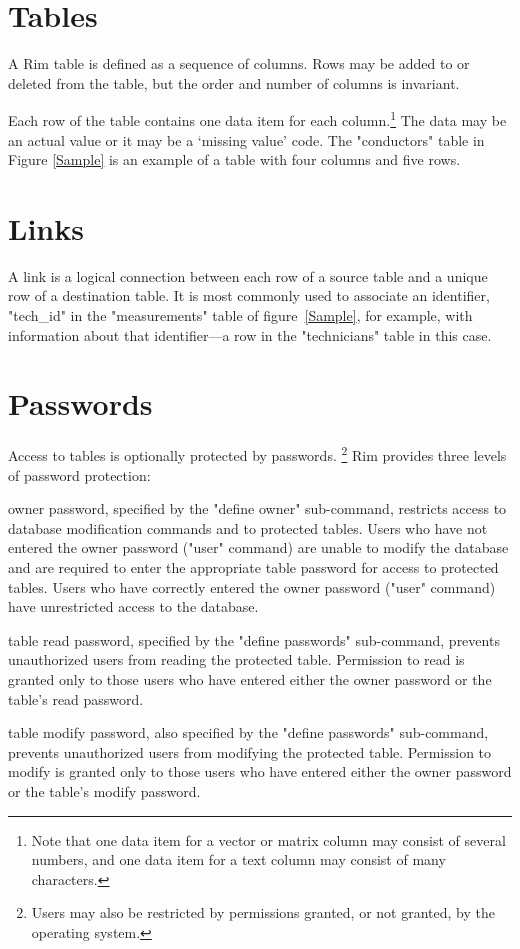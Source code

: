 \documentclass[11pt,a4paper]{report}
\def\I{\index}
\begin{document}
\section{Tables}
\I{table}
A Rim table is defined as a sequence of columns.
Rows may be added to or deleted from the table, but the
order and number of columns is invariant.
 
Each row of the table contains one data item for each
column.\footnote{Note that one data item for a vector or
matrix column may consist of several numbers, and one data item
for a text column may consist of many characters.}
The data may be an actual value or it may be a `missing value' code.
The "conductors" table in Figure \ref{Sample} is an example
of a table with four columns and five rows.
 
 
 
\section{Links}
\I{link}
A link is a logical connection between
each row of a source table and a unique
row of a destination table.
It is most commonly used to associate an identifier,
"tech\_id" in the "measurements" table of
figure~\ref{Sample}, for example,
with information about that identifier---a row in the
"technicians" table in this case.
 
\section{Passwords}
\I{password}
Access to tables is optionally protected by passwords.%
\footnote{Users may also be restricted by permissions granted,
or not granted,
by the operating system.}
Rim provides three levels of password protection:
 
\begin{List}
\item[owner password,] specified by the "define owner" sub-command,
restricts access to database modification commands and to protected
tables.
Users who have not entered the owner password ("user" command)
are unable to modify the database and are required to
enter the appropriate table password for access to
protected tables.
Users who have correctly entered the owner password ("user" command)
have unrestricted access to the database.
\item[table read password,]
specified by the "define passwords" sub-command,
prevents unauthorized users from reading the protected table.
Permission to read is granted only to those users who have entered
either the owner password or the table's read password.
\item[table modify password,] also
specified by the "define passwords" sub-com\-mand,
prevents unauthorized users from modifying the protected table.
Permission to modify is granted only to those users who have entered
either the owner password or the table's modify password.
 
\end{List}
 
\end{document}
